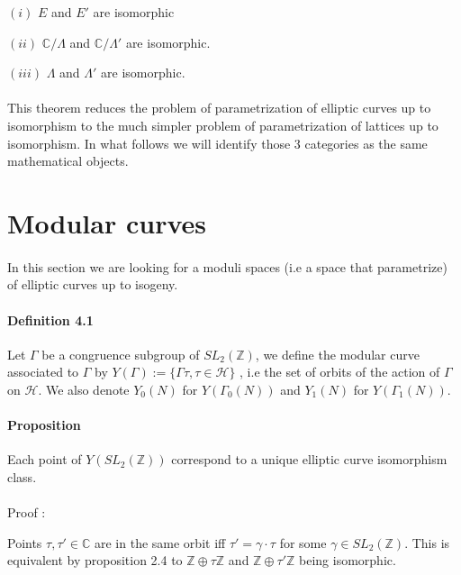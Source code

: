 \documentclass[letterpaper,10pt]{article}
\begin{document}
  $(i)$ $E$ and $E'$ are isomorphic
  
  $(ii)$  $\mathbb{C}/\Lambda$ and $\mathbb{C}/\Lambda'$ are isomorphic.
  
  $(iii)$  $\Lambda$ and $\Lambda'$ are isomorphic. \\ 
  
{\itshape \paragraph{}This theorem reduces the problem of parametrization of elliptic curves up to isomorphism to the much simpler problem of parametrization of
 lattices up to isomorphism. In what follows we will identify those 3 categories as the same mathematical objects.
}

\section{Modular curves}%

{\itshape \paragraph{} In this section we are looking for a moduli spaces (i.e a space that parametrize) of elliptic curves up to isogeny. 
}



\paragraph{Definition 4.1} Let $\Gamma$ be a congruence subgroup of $SL_2(\mathbb{Z})$, we define the modular curve associated to $\Gamma$ by
 $Y(\Gamma) := \{ \Gamma\tau , \tau \in \mathcal{H} \}$ , i.e the set of orbits of the action of $\Gamma$ on $\mathcal{H}$. We also denote $Y_0(N)$ for $Y(\Gamma_0(N))$
 and $Y_1(N)$ for $Y(\Gamma_1(N))$.


\paragraph{Proposition } Each point of $Y(SL_2(\mathbb{Z}))$ correspond to a unique elliptic curve isomorphism class.

{\itshape \paragraph{}Proof : } Points $\tau, \tau' \in \mathbb{C}$ are in the same orbit iff $\tau' = \gamma \cdot \tau$ for some $\gamma \in SL_2(\mathbb{Z})$.
This is equivalent by proposition  2.4 to $\mathbb{Z} \oplus \tau\mathbb{Z}$ and $\mathbb{Z} \oplus \tau'\mathbb{Z}$ being isomorphic.
\end{document}
